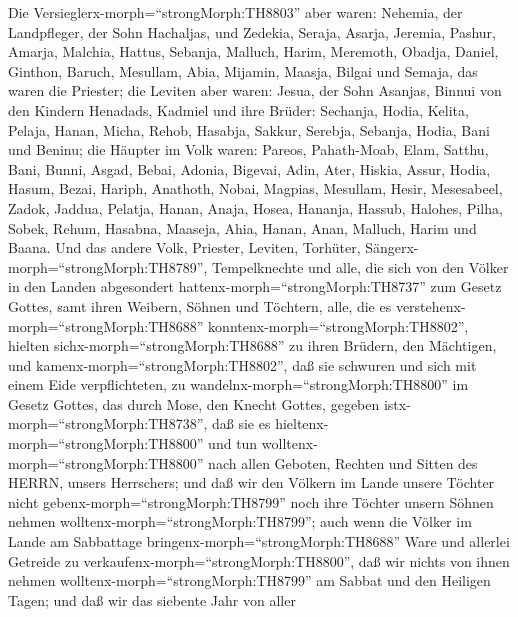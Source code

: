  Die Versieglerx-morph=``strongMorph:TH8803'' aber waren:
Nehemia, der Landpfleger, der Sohn Hachaljas, und Zedekia, 
Seraja, Asarja, Jeremia,  Pashur, Amarja, Malchia,
 Hattus, Sebanja, Malluch,  Harim, Meremoth,
Obadja,  Daniel, Ginthon, Baruch,  Mesullam,
Abia, Mijamin,  Maasja, Bilgai und Semaja, das waren die
Priester;  die Leviten aber waren: Jesua, der Sohn Asanjas,
Binnui von den Kindern Henadads, Kadmiel  und ihre Brüder:
Sechanja, Hodia, Kelita, Pelaja, Hanan,  Micha, Rehob,
Hasabja,  Sakkur, Serebja, Sebanja,  Hodia,
Bani und Beninu;  die Häupter im Volk waren: Pareos,
Pahath-Moab, Elam, Satthu, Bani,  Bunni, Asgad, Bebai,
 Adonia, Bigevai, Adin,  Ater, Hiskia, Assur,
 Hodia, Hasum, Bezai,  Hariph, Anathoth,
Nobai,  Magpias, Mesullam, Hesir,  Mesesabeel,
Zadok, Jaddua,  Pelatja, Hanan, Anaja,  Hosea,
Hananja, Hassub,  Halohes, Pilha, Sobek, 
Rehum, Hasabna, Maaseja,  Ahia, Hanan, Anan, 
Malluch, Harim und Baana.  Und das andere Volk, Priester,
Leviten, Torhüter, Sängerx-morph=``strongMorph:TH8789'', Tempelknechte
und alle, die sich von den Völker in den Landen abgesondert
hattenx-morph=``strongMorph:TH8737'' zum Gesetz Gottes, samt ihren
Weibern, Söhnen und Töchtern, alle, die es
verstehenx-morph=``strongMorph:TH8688''
konntenx-morph=``strongMorph:TH8802'',  hielten
sichx-morph=``strongMorph:TH8688'' zu ihren Brüdern, den Mächtigen, und
kamenx-morph=``strongMorph:TH8802'', daß sie schwuren und sich mit einem
Eide verpflichteten, zu wandelnx-morph=``strongMorph:TH8800'' im Gesetz
Gottes, das durch Mose, den Knecht Gottes, gegeben
istx-morph=``strongMorph:TH8738'', daß sie es
hieltenx-morph=``strongMorph:TH8800'' und tun
wolltenx-morph=``strongMorph:TH8800'' nach allen Geboten, Rechten und
Sitten des HERRN, unsers Herrschers;  und daß wir den
Völkern im Lande unsere Töchter nicht
gebenx-morph=``strongMorph:TH8799'' noch ihre Töchter unsern Söhnen
nehmen wolltenx-morph=``strongMorph:TH8799'';  auch wenn
die Völker im Lande am Sabbattage bringenx-morph=``strongMorph:TH8688''
Ware und allerlei Getreide zu verkaufenx-morph=``strongMorph:TH8800'',
daß wir nichts von ihnen nehmen wolltenx-morph=``strongMorph:TH8799'' am
Sabbat und den Heiligen Tagen; und daß wir das siebente Jahr von aller
